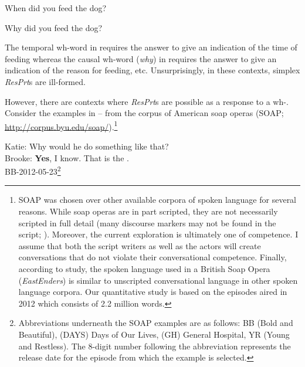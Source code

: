 \documentclass[output=paper]{LSP/langsci}
\begin{document}
\ea\label{ex:wiltschko:27}
\begin{xlist}
  When did you feed the dog?
\begin{xlisti}
 \end{xlisti}
  \end{xlist}
\z

\ea\label{ex:wiltschko:28}
\begin{xlist}
  Why did you feed the dog?
\begin{xlisti}
     \end{xlisti}
      \end{xlist}
\z

The temporal wh-word in  requires the answer to give an indication of the time of feeding whereas the causal wh-word (\textit{why}) in  requires the answer to give an indication of the reason for feeding, etc.
Unsurprisingly, in these contexts, simplex \textit{ResPrt}s are ill-formed.

However, there are contexts where \textit{ResPrt}s are possible as a response to a wh-. Consider the examples in -- from the corpus of American soap operas (SOAP; \url{http://corpus.byu.edu/soap/}).\footnote{SOAP was chosen over other available corpora of spoken language for several reasons.  While soap operas are in part scripted, they are not necessarily scripted in full detail (many discourse markers may not be found in the script; \citealt{Thoma2016}). Moreover, the current exploration is ultimately one of competence.
I assume that both the script writers as well as the actors will create conversations that do not violate their conversational competence.
Finally, according to  study, the spoken language used in a British Soap Opera (\textit{EastEnders}) is similar to unscripted conversational language in other spoken language corpora. Our quantitative study is based on the episodes aired in 2012 which consists of 2.2 million words.} 


\ea\label{ex:wiltschko:29}
Katie:    {Why would he do something like that?} \\
Brooke:   \textbf{{Yes}}{, I know. That is the .} \\
BB-2012-05-23\footnote{Abbreviations underneath the SOAP examples are as follows: BB (Bold and Beautiful), (DAYS) Days of Our Lives, (GH) General Hospital, YR (Young and Restless). The 8-digit number following the abbreviation represents the release date for the episode from which the example is selected.} 
\z
\end{document}
